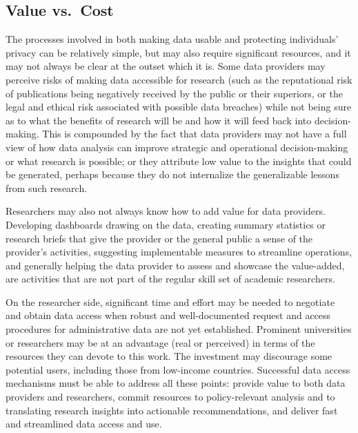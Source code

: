 \hypertarget{value-vs.-cost}{%
\subsection{Value vs.~Cost}\label{value-vs.-cost}}

The processes involved in both making data usable and protecting individuals' privacy can be relatively simple, but may also require significant resources, and it may not always be clear at the outset which it is. Some data providers may perceive risks of making data accessible for research (such as the reputational risk of publications being negatively received by the public or their superiors, or the legal and ethical risk associated with possible data breaches) while not being sure as to what the benefits of research will be and how it will feed back into decision-making. This is compounded by the fact that data providers may not have a full view of how data analysis can improve strategic and operational decision-making or what research is possible; or they attribute low value to the insights that could be generated, perhaps because they do not internalize the generalizable lessons from such research.

Researchers may also not always know how to add value for data providers. Developing dashboards drawing on the data, creating summary statistics or research briefs that give the provider or the general public a sense of the provider's activities, suggesting implementable measures to streamline operations, and generally helping the data provider to assess and showcase the value-added, are activities that are not part of the regular skill set of academic researchers.

On the researcher side, significant time and effort may be needed to negotiate and obtain data access when robust and well-documented request and access procedures for administrative data are not yet established. Prominent universities or researchers may be at an advantage (real or perceived) in terms of the resources they can devote to this work. The investment may discourage some potential users, including those from low-income countries. Successful data access mechanisms must be able to address all these points: provide value to both data providers and researchers, commit resources to policy-relevant analysis and to translating research insights into actionable recommendations, and deliver fast and streamlined data access and use.

